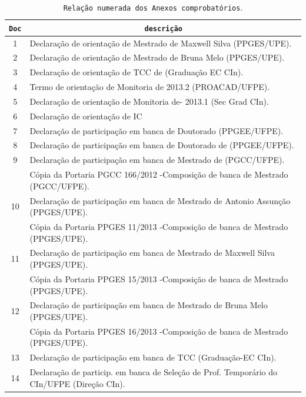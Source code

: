 \documentclass[a4paper,oneside,12pt]{article}
\newcommand{\otoprule}{\midrule[\heavyrulewidth]}
\begin{document}
\begin{table}[ht]
\small
\caption{\texttt{Relação numerada dos Anexos comprobatórios}.}
\begin{tabular}{cl}
\toprule
\large{\textbf{\texttt{Doc}}} & \multicolumn{1}{c}{\large{\textbf{\texttt{descrição}}}} \\
\otoprule
  1 & Declaração de orientação de Mestrado de Maxwell Silva (PPGES/UPE). \\
  2 & Declaração de orientação de Mestrado de Bruna Melo (PPGES/UPE). \\
  3 & Declaração de orientação de TCC de  (Graduação EC CIn). \\
  4 & Termo de orientação de Monitoria de  2013.2 (PROACAD/UFPE). \\
  5 & Declaração de orientação de Monitoria de- 2013.1 (Sec Grad CIn). \\
  6 & Declaração de orientação de IC  \\
  7 & Declaração de participação em banca de Doutorado  (PPGEE/UFPE). \\
  8 & Declaração de participação em banca de Doutorado de  (PPGEE/UFPE). \\
  \cmidrule{1-2}
  9 & Declaração de participação em banca de Mestrado de  (PGCC/UFPE). \\
    & Cópia da Portaria PGCC 166/2012 -Composição de banca de Mestrado (PGCC/UFPE). \\
  \cmidrule{1-2}
  10 & Declaração de participação em banca de Mestrado de Antonio Assunção (PPGES/UPE). \\
     & Cópia da Portaria PPGES 11/2013 -Composição de banca de Mestrado (PPGES/UPE). \\
  \cmidrule{1-2}
  11 & Declaração de participação em banca de Mestrado de Maxwell Silva (PPGES/UPE). \\
     & Cópia da Portaria PPGES 15/2013 -Composição de banca de Mestrado (PPGES/UPE). \\
  \cmidrule{1-2}
  12 & Declaração de participação em banca de Mestrado de Bruna Melo (PPGES/UPE). \\
     & Cópia da Portaria PPGES 16/2013 -Composição de banca de Mestrado (PPGES/UPE). \\
  \cmidrule{1-2}
  13 & Declaração de participação em banca de TCC (Graduação-EC CIn). \\
  14 & Declaração de particip. em banca de Seleção de Prof. Tempor\'{a}rio do CIn/UFPE (Direção CIn). \\

\end{tabular}
\end{table}
\end{document}
